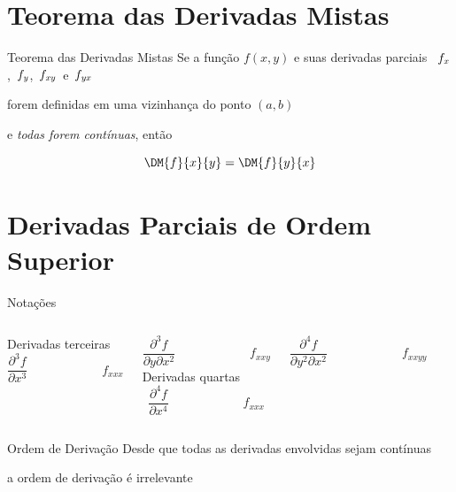 \documentclass[fleqn,utf8,aspectratio=169,12pt,ignorenonframetext]{beamer}
\begin{document}
\section{Teorema das Derivadas Mistas}

\begin{frame}{Teorema das Derivadas Mistas}
  Se a função \(f(x, y)\) e suas derivadas parciais
  \, $f_\emph{x}$,\, $f_\emph{y}$,\, $f_{\emph{xy}}$\, e \,$f_{\emph{yx}}$

  \pause
  forem definidas em uma vizinhança do ponto \((a, b)\)

  \pause
  e \emph{todas forem contínuas}, então

  \pause
  \[
    \DM{f}{x}{y} = \DM{f}{y}{x}
  \]
\end{frame}



\section{Derivadas Parciais de Ordem Superior}

\begin{frame}{Notações}
  \begin{columns}
    Derivadas terceiras
    \[
      \frac{\partial^3 f}{\partial x^3} \qquad\qquad\qquad
      f_{xxx}
    \]

    \vspace{\baselineskip}
    \[
      \frac{\partial^3 f}{\partial y\partial x^2} \qquad\qquad\qquad
      f_{xxy}
    \]
    Derivadas quartas
    \[
      \frac{\partial^4 f}{\partial x^4} \qquad\qquad\qquad
      f_{xxx}
    \]

    \vspace{\baselineskip}
    \[
      \frac{\partial^4 f}{\partial y^2 \partial x^2} \qquad\qquad\qquad
      f_{xxyy}
    \]
  \end{columns}
\end{frame}

\begin{frame}{Ordem de Derivação}
  Desde que todas as derivadas envolvidas sejam contínuas

  \pause
  a ordem de derivação é irrelevante
\end{frame}
\end{document}
